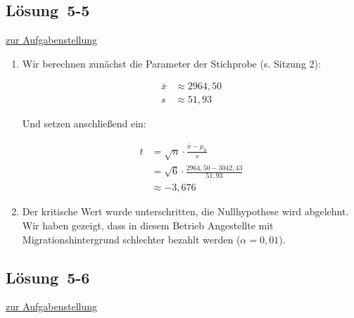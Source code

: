 \documentclass[
  11pt,
  ngerman,
  a4paper,
]{report}
\begin{document}
\hypertarget{loesung-5-5}{%
\subsection{Lösung~5-5}\label{loesung-5-5}}

\protect\hyperlink{aufgabe-5-5}{zur Aufgabenstellung}

\begin{enumerate}
\def\labelenumi{\alph{enumi})}
\item
  Wir berechnen zunächst die Parameter der Stichprobe (s. Sitzung 2):

  \[\begin{aligned}
   \bar{x}&\approx2964,50\\
   s&\approx 51,93
   \end{aligned}\]

  Und setzen anschließend ein:

  \[\begin{aligned}
   t &= \sqrt{n}\cdot\frac{\bar{x}-\mu_0}{s}\\[5pt]
   &=\sqrt{6}\cdot\frac{2964,50-3042,43}{51,93}\\
   &\approx-3,676
   \end{aligned}\]
\item
  Der kritische Wert wurde unterschritten, die Nullhypothese wird abgelehnt. Wir haben gezeigt, dass in diesem Betrieb Angestellte mit Migrationshintergrund schlechter bezahlt werden (\(\alpha=0,01\)).
\end{enumerate}

\hypertarget{loesung-5-6}{%
\subsection{Lösung~5-6}\label{loesung-5-6}}

\protect\hyperlink{aufgabe-5-6}{zur Aufgabenstellung}
\end{document}
